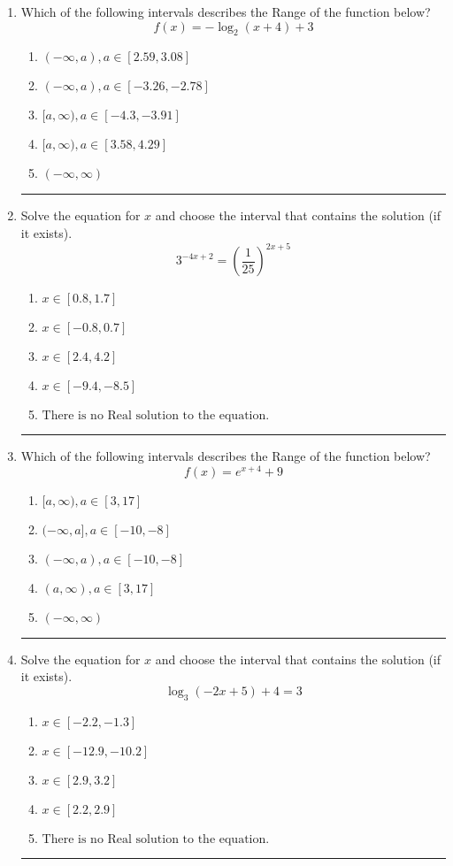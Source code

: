 \documentclass[14pt]{extbook}
\newcommand{\litem}[1]{\item#1\hspace*{-1cm}\rule{\textwidth}{0.4pt}}
\begin{document}
\begin{enumerate}
\litem{
Which of the following intervals describes the Range of the function below?\[ f(x) = -\log_2{(x+4)}+3 \]\begin{enumerate}[label=\Alph*.]
\item \( (-\infty, a), a \in [2.59, 3.08] \)
\item \( (-\infty, a), a \in [-3.26, -2.78] \)
\item \( [a, \infty), a \in [-4.3, -3.91] \)
\item \( [a, \infty), a \in [3.58, 4.29] \)
\item \( (-\infty, \infty) \)

\end{enumerate} }
\litem{
Solve the equation for $x$ and choose the interval that contains the solution (if it exists).\[ 3^{-4x+2} = \left(\frac{1}{25}\right)^{2x+5} \]\begin{enumerate}[label=\Alph*.]
\item \( x \in [0.8, 1.7] \)
\item \( x \in [-0.8, 0.7] \)
\item \( x \in [2.4, 4.2] \)
\item \( x \in [-9.4, -8.5] \)
\item \( \text{There is no Real solution to the equation.} \)

\end{enumerate} }
\litem{
Which of the following intervals describes the Range of the function below?\[ f(x) = e^{x+4}+9 \]\begin{enumerate}[label=\Alph*.]
\item \( [a, \infty), a \in [3, 17] \)
\item \( (-\infty, a], a \in [-10, -8] \)
\item \( (-\infty, a), a \in [-10, -8] \)
\item \( (a, \infty), a \in [3, 17] \)
\item \( (-\infty, \infty) \)

\end{enumerate} }
\litem{
Solve the equation for $x$ and choose the interval that contains the solution (if it exists).\[ \log_{3}{(-2x+5)}+4 = 3 \]\begin{enumerate}[label=\Alph*.]
\item \( x \in [-2.2, -1.3] \)
\item \( x \in [-12.9, -10.2] \)
\item \( x \in [2.9, 3.2] \)
\item \( x \in [2.2, 2.9] \)
\item \( \text{There is no Real solution to the equation.} \)


\end{enumerate}}
\end{enumerate}
\end{document}
